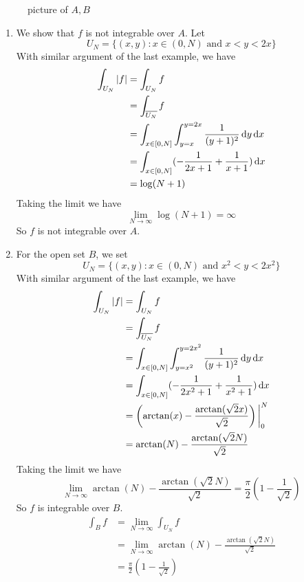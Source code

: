 \begin{itemize}
\begin{figure}[ht]
        \caption{picture of $A,B$}
    \end{figure}
    \begin{enumerate}
        \item We show that $f$ is not integrable over $A$. Let $$U_N=\{(x,y):x\in(0,N)\text{ and }x< y< 2x\}$$
        With similar argument of the last example, we have 
        \begin{equation}
            \begin{split}
                \int_{U_N}|f| &= \int_{U_N}f\\
                &= \int_{\overline{U_N}}f\\
                &= \int_{x\in[0,N]}\int_{y=x}^{y=2x}\frac{1}{(y+1)^2}\operatorname{d\!} y\operatorname{d\!} x\\
                &= \int_{x\in[0,N]}(-\frac{1}{2x+1}+\frac{1}{x+1})\operatorname{d\!} x\\
                &= \log(N+1)
            \end{split}
        \end{equation}
        Taking the limit we have $$\lim_{N\to \infty}\log(N+1)=\infty$$
        So $f$ is not integrable over $A$.
        \item For the open set $B$, we set $$U_N=\{(x,y):x\in(0,N)\text{ and }x^2< y< 2x^2\}$$
        With similar argument of the last example, we have 
        \begin{equation}
            \begin{split}
                \int_{U_N}|f| &= \int_{U_N}f\\
                &= \int_{\overline{U_N}}f\\
                &= \int_{x\in[0,N]}\int_{y=x^2}^{y=2x^2}\frac{1}{(y+1)^2}\operatorname{d\!} y\operatorname{d\!} x\\
                &= \int_{x\in[0,N]}(-\frac{1}{2x^2+1}+\frac{1}{x^2+1})\operatorname{d\!} x\\
                &= \left(\arctan(x)-\frac{\arctan(\sqrt{2}x)}{\sqrt{2}}\right) \bigg\rvert_0^N\\
                &= \arctan(N)-\frac{\arctan(\sqrt{2}N)}{\sqrt{2}}
            \end{split}
        \end{equation}
        Taking the limit we have $$\lim_{N\to\infty}\arctan(N)-\frac{\arctan(\sqrt{2}N)}{\sqrt{2}}=\frac{\pi}{2}\left(1-\frac{1}{\sqrt{2}}\right)$$
        So $f$ is integrable over $B$.
        \begin{equation}
            \begin{split}
                \int_Bf &= \lim_{N\to\infty}\int_{U_N}f\\
                &= \lim_{N\to\infty}\arctan(N)-\frac{\arctan(\sqrt{2}N)}{\sqrt{2}}\\
                &=\frac{\pi}{2}\left(1-\frac{1}{\sqrt{2}}\right)
            \end{split}
        \end{equation}
    \end{enumerate}
\end{itemize}